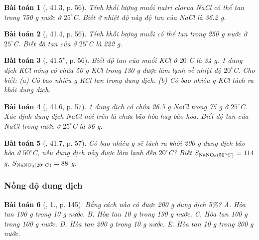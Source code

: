 \documentclass{article}
\newtheorem{baitoan}{Bài toán}
\begin{document}
\begin{baitoan}[\cite{SBT_Hoa_Hoc_8}, 41.3, p. 56]
	Tính khối lượng muối natri clorua \emph{NaCl} có thể tan trong \emph{750 g} nước ở $25^\circ$\emph{C}. Biết ở nhiệt độ này độ tan của \emph{NaCl} là \emph{36.2 g}.
\end{baitoan}

\begin{baitoan}[\cite{SBT_Hoa_Hoc_8}, 41.4, p. 56]
	Tính khối lượng muối \emph{} có thể tan trong \emph{250 g} nước ở $25^\circ$\emph{C}. Biết độ tan của \emph{} ở $25^\circ$\emph{C} là \emph{222 g}.
\end{baitoan}

\begin{baitoan}[\cite{SBT_Hoa_Hoc_8}, $41.5^\star$, p. 56]
	Biết độ tan của muối \emph{KCl} ở 	$20^\circ$\emph{C} là \emph{34 g}. 1 dung dịch \emph{KCl} nóng có chứa \emph{50 g KCl} trong \emph{130 g } được làm lạnh về nhiệt độ $20^\circ$\emph{C}. Cho biết: (a) Có bao nhiêu \emph{g KCl} tan trong dung dịch. (b) Có bao nhiêu \emph{g KCl} tách ra khỏi dung dịch.
\end{baitoan}

\begin{baitoan}[\cite{SBT_Hoa_Hoc_8}, 41.6, p. 57]
	1 dung dịch có chứa \emph{26.5 g NaCl} trong \emph{75 g } ở $25^\circ$\emph{C}. Xác định dung dịch \emph{NaCl} nói trên là chưa bão hòa hay bão hòa. Biết độ tan của \emph{NaCl} trong nước ở $25^\circ$\emph{C} là \emph{36 g}.
\end{baitoan}

\begin{baitoan}[\cite{SBT_Hoa_Hoc_8}, 41.7, p. 57]
	Có bao nhiêu \emph{g } sẽ tách ra khỏi \emph{200 g} dung dịch bão hòa \emph{} ở $50^\circ$\emph{C}, nếu dung dịch này được làm lạnh đến $20^\circ$\emph{C}? Biết \emph{$S_{\ce{NaNO3}(50^\circ C)} = 114$ g, $S_{\ce{NaNO3}(20^\circ C)} = 88$ g}.
\end{baitoan}

\subsubsection{Nồng độ dung dịch}

\begin{baitoan}[\cite{SGK_Hoa_Hoc_8}, 1., p. 145]
	Bằng cách nào có được \emph{200 g} dung dịch \emph{ 5\%}? {\sf A.} Hòa tan \emph{190 g } trong \emph{10 g} nước. {\sf B.} Hòa tan \emph{10 g } trong \emph{190 g} nước. {\sf C.} Hòa tan \emph{100 g } trong \emph{100 g} nước. {\sf D.} Hòa tan \emph{200 g } trong \emph{10 g} nước. {\sf E.} Hòa tan \emph{10 g } trong \emph{200 g} nước.
\end{baitoan}
\end{document}
